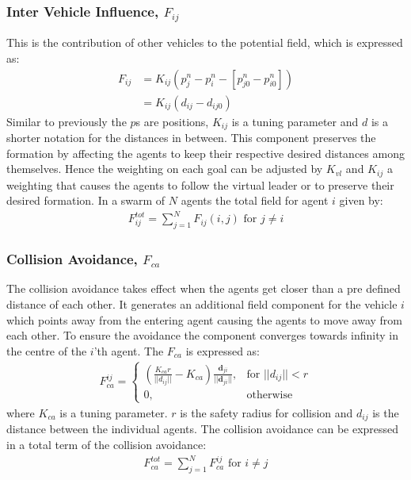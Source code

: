 \subsubsection{Inter Vehicle Influence, $F_{ij}$}
This is the contribution of other vehicles to the potential field,
which is expressed as:
\begin{align}
F_{ij} &= K_{ij}(p_{j}^n-p_i^n-[p_{j0}^n-p_{i0}^n])\\
&= K_{ij}(d_{ij}-d_{ij0})
\end{align}
Similar to previously the $p$s are positions, $K_{ij}$ is a tuning
parameter and $d$ is a shorter notation for the distances in between.
This component preserves the formation by affecting the agents to keep
their respective desired distances among themselves. Hence the
weighting on each goal can be adjusted by $K_{vl}$ and $K_{ij}$ a
weighting that causes the agents to follow the virtual leader or to
preserve their desired formation.  In a swarm of $N$ agents the total
field for agent $i$ given by:
\begin{align}
F_{ij}^{tot} = \sum\limits_{j=1}^NF_{ij}(i,j) \text{ for } j\neq i
\end{align}

\subsubsection{Collision Avoidance, $F_{ca}$}
The collision avoidance takes effect when the agents get closer than a
pre defined distance of each other. It generates an additional field
component for the vehicle $i$ which points away from the entering
agent causing the agents to move away from each other. To ensure the
avoidance the component converges towards infinity in the centre of
the $i$'th agent. The $F_{ca}$ is expressed as:
\begin{align}
    F_{ca}^{ij}= 
\begin{cases}
		\left(
    \frac{K_{ca}r}{||d_{ij}||}-K_{ca}
		\right)
		\frac{\mathbf{d}_{ji}}{||\mathbf{d}_{ji}||}
		,& \text{for } ||d_{ij}||<r\\
    0,              & \text{otherwise}
\end{cases}
\end{align}
where $K_{ca}$ is a tuning parameter. $r$ is the safety radius for
collision and $d_{ij}$ is the distance between the individual agents.
The collision avoidance can be expressed in a total term of the
collision avoidance:
\begin{align}
F_{ca}^{tot} = \sum\limits_{j=1}^NF_{ca}^{ij} \text{ for } i\neq j
\end{align}

